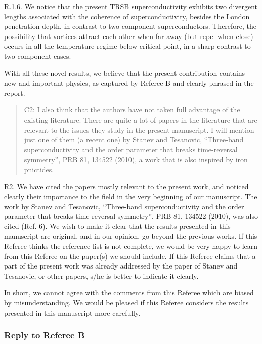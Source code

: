\documentclass[11pt]{article}
\begin{document}
R.1.6. We notice that the present TRSB superconductivity exhibits two
divergent lengths associated with the coherence of superconductivity,
besides the London penetration depth, in contrast to two-component
superconductors. Therefore, the possibility that vortices attract each
other when far away (but repel when close) occurs in all the temperature
regime below critical point, in a sharp contrast to two-component cases.

With all these novel results, we believe that the present contribution
contains new and important physics, as captured by Referee B and clearly
phrased in the report.

\begin{quote}
C2: I also think that the authors have not taken full advantage of the
existing literature. There are quite a lot of papers in the literature
that are relevant to the issues they study in the present manuscript. I
will mention just one of them (a recent one) by Stanev and Tesanovic,
``Three-band superconductivity and the order parameter that breaks
time-reversal symmetry'', PRB 81, 134522 (2010), a work that is also
inspired by iron pnictides.
\end{quote}

R2. We have cited the papers mostly relevant to the present work, and
noticed clearly their importance to the field in the very beginning of
our manuscript. The work by Stanev and Tesanovic, ``Three-band
superconductivity and the order parameter that breaks time-reversal
symmetry'', PRB 81, 134522 (2010), was also cited (Ref. 6). We wish to
make it clear that the results presented in this manuscript are
original, and in our opinion, go beyond the previous works. If this
Referee thinks the reference list is not complete, we would be very
happy to learn from this Referee on the paper(s) we should include. If
this Referee claims that a part of the present work was already
addressed by the paper of Stanev and Tesanovic, or other papers, s/he is
better to indicate it clearly.

In short, we cannot agree with the comments from this Referee which are
biased by misunderstanding. We would be pleased if this Referee
considers the results presented in this manuscript more carefully.

\hypertarget{reply-to-referee-b}{%
\subsubsection{Reply to Referee B}\label{reply-to-referee-b}}
\end{document}
